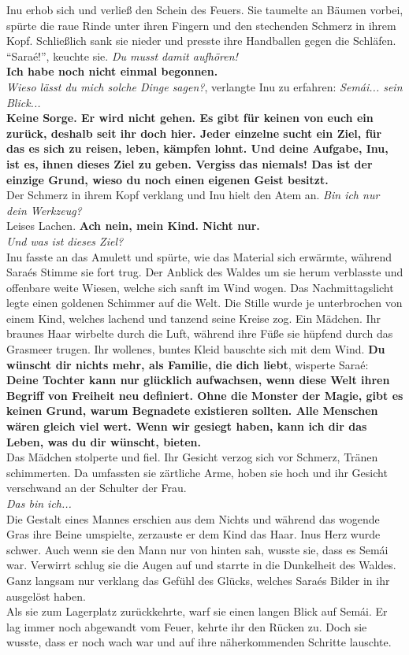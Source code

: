 Inu erhob sich und verließ den Schein des Feuers. Sie taumelte an Bäumen vorbei, spürte die raue 
Rinde unter ihren Fingern und den stechenden Schmerz in ihrem Kopf. Schließlich sank sie nieder und 
presste ihre Handballen gegen die Schläfen. 
``Saraé!'', keuchte sie. \textit{Du musst damit aufhören!}\\
\textbf{Ich habe noch nicht einmal begonnen.}\\
\textit{Wieso lässt du mich solche Dinge sagen?}, verlangte Inu zu erfahren: \textit{Semái... sein 
Blick...}\\
\textbf{Keine Sorge. Er wird nicht gehen. Es gibt für keinen von euch ein zurück, deshalb seit ihr 
doch hier. Jeder einzelne sucht ein Ziel, für das es sich zu reisen, leben, kämpfen lohnt. Und 
deine Aufgabe, Inu, ist es, ihnen dieses Ziel zu geben. Vergiss das niemals! Das ist der einzige 
Grund, wieso du noch einen eigenen Geist besitzt.}\\
Der Schmerz in ihrem Kopf verklang und Inu hielt den Atem an. \textit{Bin ich nur dein Werkzeug?}\\
Leises Lachen. \textbf{Ach nein, mein Kind. Nicht nur.}\\
\textit{Und was ist dieses Ziel?}\\
Inu fasste an das Amulett und spürte, wie das Material sich erwärmte, während Saraés Stimme sie 
fort trug. Der Anblick des Waldes um sie herum verblasste und offenbare weite Wiesen, welche sich 
sanft im Wind wogen. Das Nachmittagslicht legte einen goldenen Schimmer auf die Welt. Die Stille 
wurde je unterbrochen von einem Kind, welches lachend und tanzend seine Kreise zog. Ein Mädchen. 
Ihr braunes Haar wirbelte durch die Luft, während ihre Füße sie hüpfend durch das Grasmeer trugen. 
Ihr wollenes, buntes Kleid bauschte sich mit dem Wind.
\textbf{Du wünscht dir nichts mehr, als Familie, die dich liebt}, wisperte Saraé: \textbf{Deine 
Tochter kann nur glücklich aufwachsen, wenn diese Welt ihren Begriff von Freiheit neu definiert. 
Ohne die Monster der Magie, gibt es keinen Grund, warum Begnadete existieren sollten. Alle Menschen 
wären gleich viel wert. Wenn wir gesiegt haben, kann ich dir das Leben, was du dir wünscht, 
bieten.}\\
Das Mädchen stolperte und fiel. Ihr Gesicht verzog sich vor Schmerz, Tränen schimmerten. Da 
umfassten sie zärtliche Arme, hoben sie hoch und ihr Gesicht verschwand an der Schulter der Frau.\\
\textit{Das bin ich...}\\
Die Gestalt eines Mannes erschien aus dem Nichts und während das wogende Gras ihre Beine umspielte, 
zerzauste er dem Kind das Haar. Inus Herz wurde schwer. Auch wenn sie den Mann nur von hinten sah, 
wusste sie, dass es Semái war. Verwirrt schlug sie die Augen auf und starrte in die Dunkelheit des 
Waldes. Ganz langsam nur verklang das Gefühl des Glücks, welches Saraés Bilder in ihr ausgelöst 
haben.\\
Als sie zum Lagerplatz zurückkehrte, warf sie einen langen Blick auf Semái. Er lag immer noch 
abgewandt vom Feuer, kehrte ihr den Rücken zu. Doch sie wusste, dass er noch wach war und auf ihre 
näherkommenden Schritte lauschte. 

